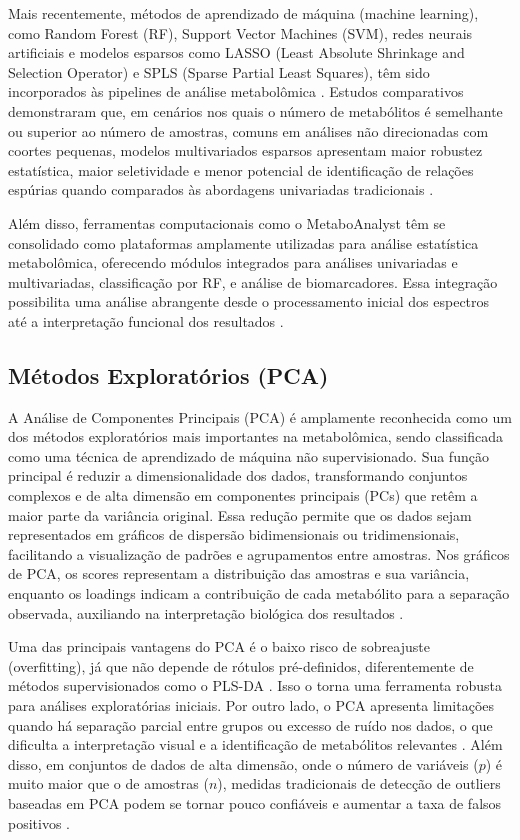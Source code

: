 Mais recentemente, métodos de aprendizado de máquina (machine learning), como Random Forest (RF), Support Vector Machines (SVM), redes neurais artificiais e modelos esparsos como LASSO (Least Absolute Shrinkage and Selection Operator) e SPLS (Sparse Partial Least Squares), têm sido incorporados às pipelines de análise metabolômica \cite{anwardeen2023statistical}. Estudos comparativos demonstraram que, em cenários nos quais o número de metabólitos é semelhante ou superior ao número de amostras, comuns em análises não direcionadas com coortes pequenas, modelos multivariados esparsos apresentam maior robustez estatística, maior seletividade e menor potencial de identificação de relações espúrias quando comparados às abordagens univariadas tradicionais \cite{henglin2022quantitative}.

Além disso, ferramentas computacionais como o MetaboAnalyst têm se consolidado como plataformas amplamente utilizadas para análise estatística metabolômica, oferecendo módulos integrados para análises univariadas e multivariadas, classificação por RF, e análise de biomarcadores. Essa integração possibilita uma análise abrangente desde o processamento inicial dos espectros até a interpretação funcional dos resultados \cite{pang2024metaboanalyst}.

\subsection{Métodos Exploratórios (PCA)}

A Análise de Componentes Principais (PCA) é amplamente reconhecida como um dos métodos exploratórios mais importantes na metabolômica, sendo classificada como uma técnica de aprendizado de máquina não supervisionado. Sua função principal é reduzir a dimensionalidade dos dados, transformando conjuntos complexos e de alta dimensão em componentes principais (PCs) que retêm a maior parte da variância original. Essa redução permite que os dados sejam representados em gráficos de dispersão bidimensionais ou tridimensionais, facilitando a visualização de padrões e agrupamentos entre amostras. Nos gráficos de PCA, os scores representam a distribuição das amostras e sua variância, enquanto os loadings indicam a contribuição de cada metabólito para a separação observada, auxiliando na interpretação biológica dos resultados \cite{mayonu2026evaluation}.

Uma das principais vantagens do PCA é o baixo risco de sobreajuste (overfitting), já que não depende de rótulos pré-definidos, diferentemente de métodos supervisionados como o PLS-DA \cite{jiang2022principal}. Isso o torna uma ferramenta robusta para análises exploratórias iniciais. Por outro lado, o PCA apresenta limitações quando há separação parcial entre grupos ou excesso de ruído nos dados, o que dificulta a interpretação visual e a identificação de metabólitos relevantes \cite{mayonu2026evaluation}. Além disso, em conjuntos de dados de alta dimensão, onde o número de variáveis ($p$) é muito maior que o de amostras ($n$), medidas tradicionais de detecção de outliers baseadas em PCA podem se tornar pouco confiáveis e aumentar a taxa de falsos positivos \cite{brini2021improved}.

